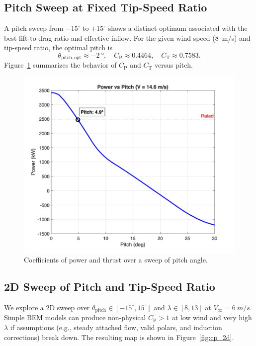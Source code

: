 \documentclass[11pt]{article}
\begin{document}
\subsection{Pitch Sweep at Fixed Tip-Speed Ratio}
A pitch sweep from \(-15^\circ\) to \(+15^\circ\) shows a distinct optimum associated with the best lift-to-drag ratio and effective inflow. For the given wind speed (\SI{8}{m/s}) and tip-speed ratio, the optimal pitch is
\begin{equation*}
\theta_\mathrm{pitch,opt} \approx -\SI{2}{\degree}, \quad C_\mathrm{P} \approx 0.4464, \quad C_\mathrm{T} \approx 0.7583.
\end{equation*}
Figure~\ref{fig:pitch_sweep} summarizes the behavior of \(C_\mathrm{P}\) and \(C_\mathrm{T}\) versus pitch.

\begin{figure}[h]
  \centering
  \includegraphics[width=0.95\linewidth]{../../PNGS/Deliverable4_Power_vs_Pitch.png}
  \caption{Coefficients of power and thrust over a sweep of pitch angle.}
  \label{fig:pitch_sweep}
\end{figure}

\subsection{2D Sweep of Pitch and Tip-Speed Ratio}
We explore a 2D sweep over \(\theta_\mathrm{pitch} \in [-15^\circ,15^\circ]\) and \(\lambda \in [8,13]\) at \(V_\infty=\SI{6}{m/s}\). Simple BEM models can produce non-physical \(C_\mathrm{P} > 1\) at low wind and very high \(\lambda\) if assumptions (e.g., steady attached flow, valid polars, and induction corrections) break down.  The resulting map is shown in Figure~\ref{fig:cp_2d}.
\end{document}

